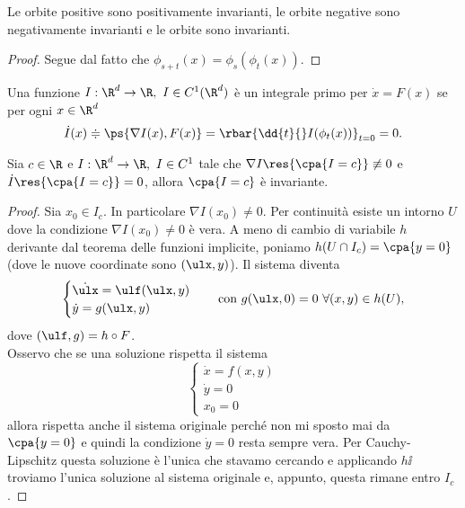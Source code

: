 \begin{remark}
Le orbite positive sono positivamente invarianti, le orbite negative sono negativamente invarianti e le orbite sono invarianti.
\end{remark}
\begin{proof}
Segue dal fatto che $\phi_{s+t}(x)=\phi_s(\phi_t(x))$.
\end{proof}

\begin{definition}
Una funzione $I:\R^d\to \R,\ I\in C^1(\R^d)$ \`e un integrale primo per $\dot x=F(x)$ se per ogni $x\in\R^d$
\[\dot I(x)\doteqdot \ps{\nabla I(x),F(x)}=\rbar{\dd{t}{}I(\phi_t(x))}_{t=0}=0.\]
\end{definition}



\begin{proposition}\label{CostruzioneInsiemiInvariantiCurveDiLivello}
Sia $c\in\R$ e $I:\R^d\to \R,\ I\in C^1$ tale che $\nabla I\res{\cpa{I=c}}\not\equiv 0$ e $\dot I\res{\cpa{I=c}}=0$, allora $\cpa{I=c}$ \`e invariante.
\end{proposition}
\begin{proof}
Sia $x_0\in I_c$. In particolare $\nabla I(x_0)\neq 0$. Per continuit\`a esiste un intorno $U$ dove la condizione $\nabla I(x_0)\neq0$ \`e vera. A meno di cambio di variabile $h$ derivante dal teorema delle funzioni implicite, poniamo $h(U\cap I_c)=\cpa{y=0}$ (dove le nuove coordinate sono $(\ulx, y)$). Il sistema diventa
\[\begin{cases}
\dot \ulx=\ulf(\ulx,y)\\
\dot y=g(\ulx,y)
\end{cases}\quad \text{con }g(\ulx,0)=0\ \forall (x,y)\in h(U),\]
dove $(\ulf, g)=h\circ F$.\\
Osservo che se una soluzione rispetta il sistema
\[\begin{cases}
\dot x=f(x,y)\\
\dot y=0\\
x_0=0
\end{cases}\]  
allora rispetta anche il sistema originale perch\'e non mi sposto mai da $\cpa{y=0}$ e quindi la condizione $\dot y=0$ resta sempre vera. Per Cauchy-Lipschitz questa soluzione \`e l'unica che stavamo cercando e applicando $h\ii$ troviamo l'unica soluzione al sistema originale e, appunto, questa rimane entro $I_c$.
\end{proof}

